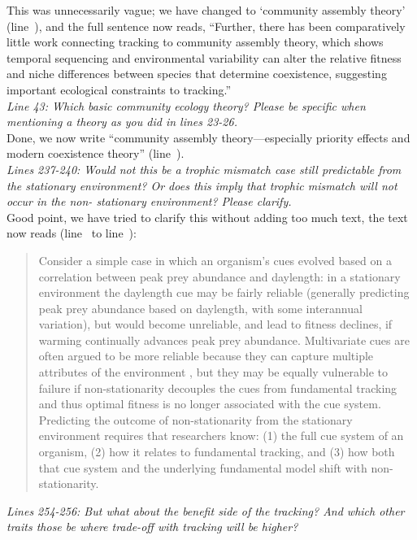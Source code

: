 \documentclass[11pt]{article}
\newcommand{\lr}[1]{line~\lineref{#1}}
\begin{document}
This was unnecessarily vague; we have changed to `community assembly theory' (\lr{r3misc3}), and the full sentence now reads, ``Further, there has been comparatively little work connecting tracking to community assembly theory, which shows temporal sequencing and environmental variability can alter the relative fitness and niche differences between species that determine coexistence, suggesting important ecological constraints to tracking.''\\

\emph{Line 43: Which basic community ecology theory? Please be specific when mentioning a theory as
you did in lines 23-26.}\\

Done, we now write ``community assembly theory---especially priority effects and modern coexistence theory'' (\lr{r3misc4}).\\

\emph{Lines 237-240: Would not this be a trophic mismatch case still predictable from the
stationary environment? Or does this imply that trophic mismatch will not occur in the non-
stationary environment? Please clarify.}\\

Good point, we have tried to clarify this without adding too much text, the text now reads (\lr{r3birdsS} to \lr{r3birdsE}):
\begin{quote}
Consider a simple case in which an organism's cues evolved based on a correlation between peak prey abundance and daylength: in a stationary environment the daylength cue may be fairly reliable (generally predicting peak prey abundance based on daylength, with some interannual variation), but would become unreliable, and lead to fitness declines, if warming continually advances peak prey abundance. Multivariate cues are often argued to be more reliable because they can capture multiple attributes of the environment \citep{dore2018,bonamour2019}, but they may be equally vulnerable to failure if non-stationarity decouples the cues from fundamental tracking \citep{bonamour2019} and thus optimal fitness is no longer associated with the cue system. Predicting the outcome of non-stationarity from the stationary environment requires that researchers know: (1) the full cue system of an organism, (2) how it relates to fundamental tracking, and (3) how both that cue system and the underlying fundamental model shift with non-stationarity.
\end{quote}

\emph{Lines 254-256: But what about the benefit side of the tracking? And which other traits those
be where trade-off with tracking will be higher?}\\
\end{document}

